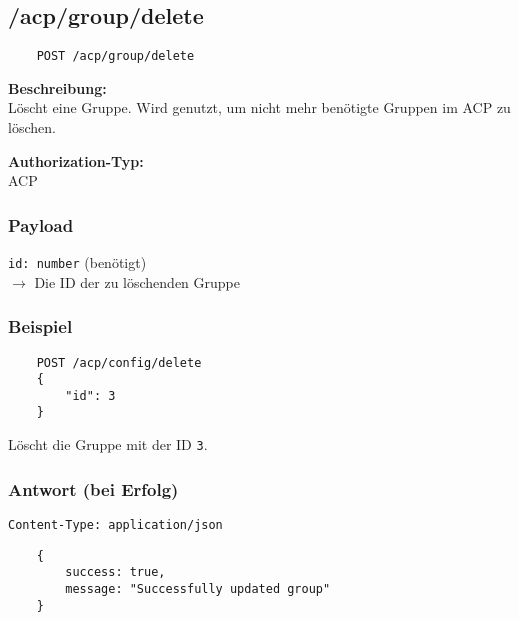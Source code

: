 \subsection{/acp/group/delete}

\begin{lstlisting}
    POST /acp/group/delete
\end{lstlisting}

\textbf{Beschreibung:} \\
Löscht eine Gruppe. Wird genutzt, um nicht mehr benötigte Gruppen im ACP zu löschen.

\textbf{Authorization-Typ:} \\
ACP

\subsubsection{Payload}

\lstinline{id: number} (benötigt) \\
$\rightarrow$ Die ID der zu löschenden Gruppe

\subsubsection{Beispiel}

\begin{lstlisting}
    POST /acp/config/delete
    {
        "id": 3
    }
\end{lstlisting}

Löscht die Gruppe mit der ID \lstinline{3}.

\subsubsection{Antwort (bei Erfolg)}

\lstinline{Content-Type: application/json}
\begin{lstlisting}
    {
        success: true, 
        message: "Successfully updated group"
    }
\end{lstlisting}